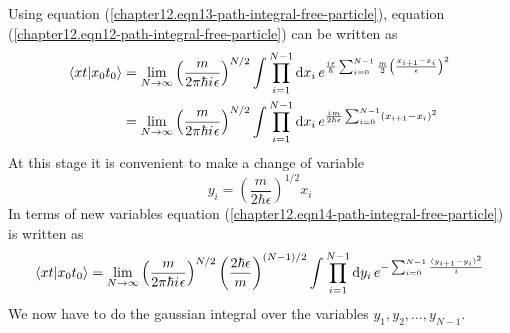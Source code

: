 	Using equation (\ref{chapter12.eqn13-path-integral-free-particle}), equation (\ref{chapter12.eqn12-path-integral-free-particle}) can be written as
	\begin{align}
		\braket{x t}{x_0 t_0} 
		&= \lim\limits_{N \rightarrow \infty} \left(\frac{m}{2\pi \hbar {i\mkern1mu} \epsilon}\right)^{N/2} \int \prod_{i=1}^{N-1} \dd{x_i} e^{\frac{{i\mkern1mu} \epsilon}{\hbar} \sum_{i=0}^{N-1} \frac{m}{2} \left(\frac{x_{i+1} - x_i}{\epsilon}\right)^2} \\
		&= \lim\limits_{N \rightarrow \infty} \left(\frac{m}{2\pi \hbar {i\mkern1mu} \epsilon}\right)^{N/2} \int \prod_{i=1}^{N-1} \dd{x_i} e^{\frac{{i\mkern1mu} m}{2\hbar \epsilon} \sum_{i=0}^{N-1} (x_{i+1} - x_i)^2}
		\label{chapter12.eqn14-path-integral-free-particle}
	\end{align}
	At this stage it is convenient to make a change of variable
	\begin{equation}
		y_i = \left(\frac{m}{2\hbar \epsilon}\right)^{1/2} x_i
	\end{equation}
	In terms of new variables equation (\ref{chapter12.eqn14-path-integral-free-particle}) is written as
	\begin{equation}
		\braket{x t}{x_0 t_0} 
		= \lim\limits_{N \rightarrow \infty} \left(\frac{m}{2\pi \hbar {i\mkern1mu} \epsilon}\right)^{N/2} \left(\frac{2\hbar \epsilon}{m}\right)^{(N-1)/2} \int \prod_{i=1}^{N-1} \dd{y_i} e^{-\sum_{i=0}^{N-1} \frac{(y_{i+1} - y_i)^2}{i}}
		\label{chapter12.eqn15-path-integral-free-particle}
	\end{equation}
	We now have to do the gaussian integral over the variables $y_1, y_2, \ldots, y_{N-1}$.\\
	
